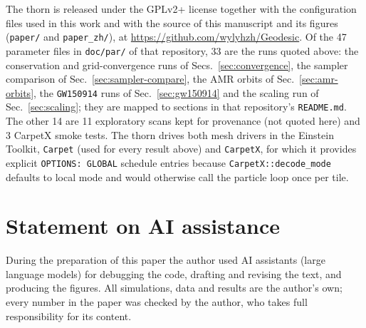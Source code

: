 \documentclass[11pt]{article}
\begin{document}
The thorn is released under the GPLv2+ license together with the
configuration files used in this work and with the source of this manuscript
and its figures (\texttt{paper/} and \texttt{paper\_zh/}), at
\url{https://github.com/wylyhzh/Geodesic}.  Of the 47 parameter files in
\texttt{doc/par/} of that repository, 33 are the runs quoted above: the
conservation and grid-convergence runs of Secs.~\ref{sec:convergence}, the
sampler comparison of Sec.~\ref{sec:sampler-compare}, the AMR orbits of
Sec.~\ref{sec:amr-orbits}, the \texttt{GW150914} runs of
Sec.~\ref{sec:gw150914} and the scaling run of Sec.~\ref{sec:scaling};
they are mapped to sections in that repository's \texttt{README.md}.  The
other 14 are 11 exploratory scans kept for provenance (not quoted here)
and 3 CarpetX smoke tests.  The thorn drives both mesh drivers in the
Einstein Toolkit, \texttt{Carpet} (used for every result above) and
\texttt{CarpetX}, for which it provides explicit \texttt{OPTIONS: GLOBAL}
schedule entries because \texttt{CarpetX::decode\_mode} defaults to local
mode and would otherwise call the particle loop once per tile.

\section*{Statement on AI assistance}

During the preparation of this paper the author used AI assistants
(large language models) for debugging the code, drafting and revising
the text, and producing the figures.  All simulations, data and results
are the author's own; every number in the paper was checked by the
author, who takes full responsibility for its content.



\end{document}
